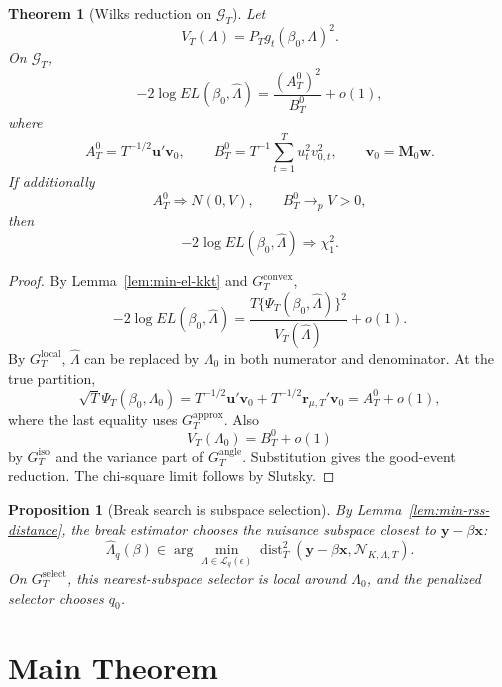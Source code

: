 \documentclass[12pt]{article}
\numberwithin{equation}{section}
\newtheorem{theorem}{Theorem}
\newtheorem{proposition}{Proposition}
\theoremstyle{definition}
\newcommand{\N}{\mathcal N}
\begin{document}
\begin{theorem}[Wilks reduction on \(\mathcal G_T\)]
\label{thm:min-wilks-reduction}
Let
\[
    V_T(\Lambda)=P_Tg_t(\beta_0,\Lambda)^2.
\]
On \(\mathcal G_T\),
\[
    -2\log EL(\beta_0,\widehat\Lambda)
    =
    \frac{(A_T^0)^2}{B_T^0}+o(1),
\]
where
\[
    A_T^0=T^{-1/2}\bm u'\bm v_0,
    \qquad
    B_T^0=T^{-1}\sum_{t=1}^Tu_t^2v_{0,t}^2,
    \qquad
    \bm v_0=\bm M_0\bm w.
\]
If additionally
\[
    A_T^0\Rightarrow N(0,V),
    \qquad
    B_T^0\to_p V>0,
\]
then
\[
    -2\log EL(\beta_0,\widehat\Lambda)\Rightarrow \chi_1^2.
\]
\end{theorem}

\begin{proof}
By Lemma~\ref{lem:min-el-kkt} and \(G_T^{\mathrm{convex}}\),
\[
    -2\log EL(\beta_0,\widehat\Lambda)
    =
    \frac{T\{\Psi_T(\beta_0,\widehat\Lambda)\}^2}
         {V_T(\widehat\Lambda)}+o(1).
\]
By \(G_T^{\mathrm{local}}\), \(\widehat\Lambda\) can be replaced by
\(\Lambda_0\) in both numerator and denominator. At the true partition,
\[
    \sqrt T\Psi_T(\beta_0,\Lambda_0)
    =
    T^{-1/2}\bm u'\bm v_0
    +
    T^{-1/2}\bm r_{\mu,T}'\bm v_0
    =
    A_T^0+o(1),
\]
where the last equality uses \(G_T^{\mathrm{approx}}\). Also
\[
    V_T(\Lambda_0)=B_T^0+o(1)
\]
by \(G_T^{\mathrm{iso}}\) and the variance part of \(G_T^{\mathrm{angle}}\).
Substitution gives the good-event reduction. The chi-square limit follows by
Slutsky.
\end{proof}

\begin{proposition}[Break search is subspace selection]
\label{prop:min-break-search}
By Lemma~\ref{lem:min-rss-distance}, the break estimator chooses the nuisance
subspace closest to \(\bm y-\beta\bm x\):
\[
    \widehat\Lambda_q(\beta)
    \in
    \arg\min_{\Lambda\in\mathcal L_q(\epsilon)}
    \operatorname{dist}_T^2(\bm y-\beta\bm x,\N_{K,\Lambda,T}).
\]
On \(G_T^{\mathrm{select}}\), this nearest-subspace selector is local around
\(\Lambda_0\), and the penalized selector chooses \(q_0\).
\end{proposition}

\section{Main Theorem}
\end{document}
